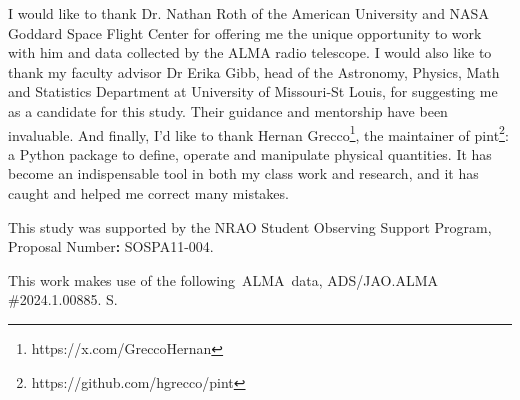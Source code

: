 \documentclass[]{aastex7}
\begin{document}
I would like to thank Dr. Nathan Roth of the American University and NASA Goddard Space Flight Center for offering me the unique opportunity to work with him and data collected by the ALMA radio telescope. I would also like to thank my faculty advisor Dr Erika Gibb, head of the Astronomy, Physics, Math and Statistics Department at University of Missouri-St Louis, for suggesting me as a candidate for this study. Their guidance and mentorship have been invaluable. And finally, I'd like to thank Hernan Grecco\footnote{https://x.com/GreccoHernan}, the maintainer of pint\footnote{https://github.com/hgrecco/pint}: a Python package to define, operate and manipulate physical quantities. It has become an indispensable tool in both my class work and research, and it has caught and helped me correct many mistakes.

This study was supported by the NRAO Student Observing Support Program, Proposal Number\textbf{:} SOSPA11-004.

This work makes use of the following~ALMA~data, ADS/JAO.ALMA \#2024.1.00885. S.



\end{document}
